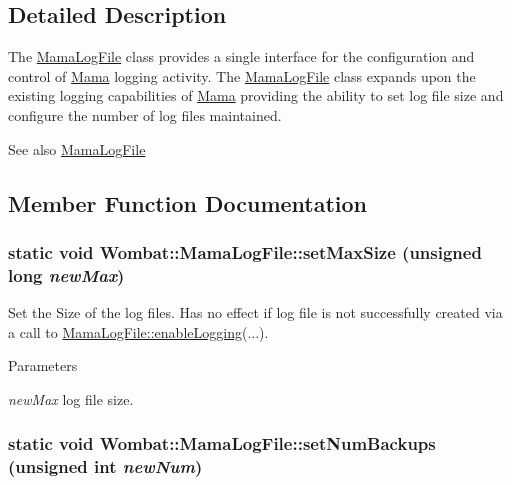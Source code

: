 \subsection{Detailed Description}
The {\ttfamily \hyperlink{classWombat_1_1MamaLogFile}{MamaLogFile}} class provides a single interface for the configuration and control of {\ttfamily \hyperlink{classWombat_1_1Mama}{Mama}} logging activity. The {\ttfamily \hyperlink{classWombat_1_1MamaLogFile}{MamaLogFile}} class expands upon the existing logging capabilities of {\ttfamily \hyperlink{classWombat_1_1Mama}{Mama}} providing the ability to set log file size and configure the number of log files maintained.

\begin{DoxySeeAlso}{See also}
\hyperlink{classWombat_1_1MamaLogFile}{MamaLogFile} 
\end{DoxySeeAlso}


\subsection{Member Function Documentation}
\hypertarget{classWombat_1_1MamaLogFile_a4d47bedcb3fcbaf6f7b9cf86f5195173}{
\subsubsection[{setMaxSize}]{\setlength{\rightskip}{0pt plus 5cm}static void Wombat::MamaLogFile::setMaxSize (unsigned long {\em newMax})}}
\label{classWombat_1_1MamaLogFile_a4d47bedcb3fcbaf6f7b9cf86f5195173}


Set the Size of the log files. Has no effect if log file is not successfully created via a call to \hyperlink{classWombat_1_1MamaLogFile_ad5b9f7b07ccf958ea340c582c89a13a1}{MamaLogFile::enableLogging}(...).


\begin{DoxyParams}{Parameters}
\item[{\em newMax}]log file size. \end{DoxyParams}
\hypertarget{classWombat_1_1MamaLogFile_a29e1e1f8ca191340e7f1289af05fb3c0}{
\subsubsection[{setNumBackups}]{\setlength{\rightskip}{0pt plus 5cm}static void Wombat::MamaLogFile::setNumBackups (unsigned int {\em newNum})}}
\label{classWombat_1_1MamaLogFile_a29e1e1f8ca191340e7f1289af05fb3c0}


